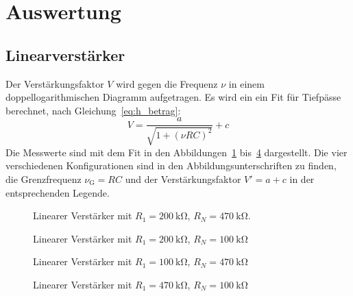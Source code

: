 \section{Auswertung}%
\label{sec:auswertung}
\subsection{Linearverst\"arker}
Der Verstärkungsfaktor $V$ wird gegen die Frequenz $\nu$ in einem doppellogarithmischen Diagramm aufgetragen.
Es wird ein ein Fit für Tiefpässe berechnet, nach Gleichung~\eqref{eq:h_betrag}:
\begin{equation}
  V = \frac{a}{\sqrt{1 + {\left(\nu RC\right)}^{2}}} + c
\end{equation}
Die Messwerte sind mit dem Fit in den Abbildungen~\ref{fig:lin_verst_01} bis~\ref{fig:lin_verst_04} dargestellt.
Die vier verschiedenen Konfigurationen sind in den Abbildungsunterschriften zu finden,
die Grenzfrequenz $\nu_\text{G} = RC$ und der Verstärkungsfaktor $V' = a + c$ in der entsprechenden Legende.

\begin{figure}[ht]
  \centering
  
  \caption{Linearer Verst\"arker mit $R_1 = \SI{200}{\kilo\ohm}$, $R_N = \SI{470}{\kilo\ohm}$.}
  \label{fig:lin_verst_01}
\end{figure}

\begin{figure}[ht]
  \centering
  
  \caption{Linearer Verst\"arker mit $R_1 = \SI{200}{\kilo\ohm}$, $R_N = \SI{100}{\kilo\ohm}$}
  \label{fig:lin_verst_02}
\end{figure}

\begin{figure}[ht]
  \centering
  
  \caption{Linearer Verst\"arker mit $R_1 = \SI{100}{\kilo\ohm}$, $R_N = \SI{470}{\kilo\ohm}$}
  \label{fig:lin_verst_03}
\end{figure}

\begin{figure}[ht]
  \centering
  
  \caption{Linearer Verst\"arker mit $R_1 = \SI{470}{\kilo\ohm}$, $R_N = \SI{100}{\kilo\ohm}$}
  \label{fig:lin_verst_04}
\end{figure}

